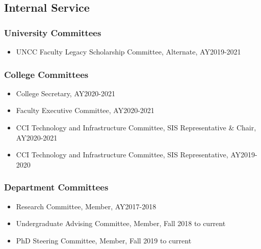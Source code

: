 
\hypertarget{internal-service}{%
\subsection{Internal Service}\label{internal-service}}

\hypertarget{university-committees}{%
\subsubsection{University Committees}\label{university-committees}}
\begin{itemize}
\item UNCC Faculty Legacy Scholarship Committee, Alternate, AY2019-2021
\end{itemize}

\hypertarget{college-committees}{%
\subsubsection{College Committees}\label{college-committees}}
\begin{itemize}
\item College Secretary, AY2020-2021
\item Faculty Executive Committee, AY2020-2021
\item CCI Technology and Infrastructure Committee, SIS Representative \& Chair, AY2020-2021
\item CCI Technology and Infrastructure Committee, SIS Representative, AY2019-2020
\end{itemize}

\hypertarget{dept-committees}{%
\subsubsection{Department Committees}\label{dept-committees}}
\begin{itemize}
\item Research Committee, Member, AY2017-2018
\item Undergraduate Advising Committee, Member, Fall 2018 to current
\item PhD Steering Committee, Member, Fall 2019 to current
\end{itemize}

